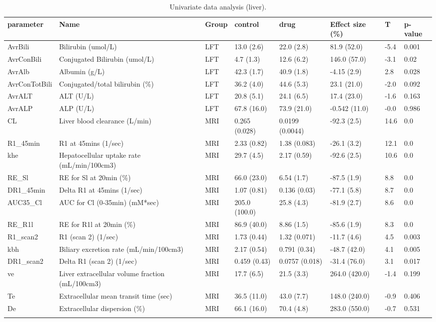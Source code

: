 \documentclass{epflreport}%
\begin{document}
\begin{longtable}{|p{1.5cm}|p{1.5cm}|p{1.5cm}|p{1.5cm}|p{1.5cm}|p{1.5cm}|p{1.5cm}|p{1.5cm}|}%
\hline%
parameter&Name&Group&control&drug&Effect size (\%)&T&p{-}value\\%
\hline%
AvrBili&Bilirubin (umol/L)&LFT&13.0 (2.6) &22.0 (2.8) &81.9 (52.0) &{-}5.4&0.001\\%
AvrConBili&Conjugated Bilirubin (umol/L)&LFT&4.7 (1.3) &12.6 (6.2) &146.0 (57.0) &{-}3.1&0.02\\%
AvrAlb&Albumin (g/L)&LFT&42.3 (1.7) &40.9 (1.8) &{-}4.15 (2.9) &2.8&0.028\\%
AvrConTotBili&Conjugated/total bilirubin (\%)&LFT&36.2 (4.0) &44.6 (5.3) &23.1 (21.0) &{-}2.0&0.092\\%
AvrALT&ALT (U/L)&LFT&20.8 (5.1) &24.1 (6.5) &17.4 (23.0) &{-}1.6&0.163\\%
AvrALP&ALP (U/L)&LFT&67.8 (16.0) &73.9 (21.0) &{-}0.542 (11.0) &{-}0.0&0.986\\%
CL&Liver blood clearance (L/min)&MRI&0.265 (0.028) &0.0199 (0.0044) &{-}92.3 (2.5) &14.6&0.0\\%
R1\_45min&R1 at 45mins (1/sec)&MRI&2.33 (0.82) &1.38 (0.083) &{-}26.1 (3.2) &12.1&0.0\\%
khe&Hepatocellular uptake rate (mL/min/100cm3)&MRI&29.7 (4.5) &2.17 (0.59) &{-}92.6 (2.5) &10.6&0.0\\%
RE\_Sl&RE for Sl at 20min (\%)&MRI&66.0 (23.0) &6.54 (1.7) &{-}87.5 (1.9) &8.8&0.0\\%
DR1\_45min&Delta R1 at 45mins (1/sec)&MRI&1.07 (0.81) &0.136 (0.03) &{-}77.1 (5.8) &8.7&0.0\\%
AUC35\_Cl&AUC for Cl (0{-}35min) (mM*sec)&MRI&205.0 (100.0) &25.8 (4.3) &{-}81.9 (2.7) &8.6&0.0\\%
RE\_R1l&RE for R1l at 20min (\%)&MRI&86.9 (40.0) &8.86 (1.5) &{-}85.6 (1.9) &8.3&0.0\\%
R1\_scan2&R1 (scan 2) (1/sec)&MRI&1.73 (0.44) &1.32 (0.071) &{-}11.7 (4.6) &4.5&0.003\\%
kbh&Biliary excretion rate (mL/min/100cm3)&MRI&2.17 (0.54) &0.791 (0.34) &{-}48.7 (42.0) &4.1&0.005\\%
DR1\_scan2&Delta R1 (scan 2) (1/sec)&MRI&0.459 (0.43) &0.0757 (0.018) &{-}31.4 (76.0) &3.1&0.017\\%
ve&Liver extracellular volume fraction (mL/100cm3)&MRI&17.7 (6.5) &21.5 (3.3) &264.0 (420.0) &{-}1.4&0.199\\%
Te&Extracellular mean transit time (sec)&MRI&36.5 (11.0) &43.0 (7.7) &148.0 (240.0) &{-}0.9&0.406\\%
De&Extracellular dispersion (\%)&MRI&66.1 (16.0) &70.4 (4.8) &283.0 (550.0) &{-}0.7&0.531\\%
\hline%
\caption{Univariate data analysis (liver).} \\%
\end{longtable}%
\end{document}
